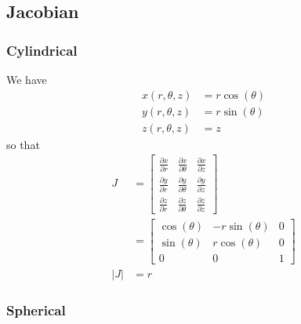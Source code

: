 \newpage

\subsection{Jacobian}

\subsubsection{Cylindrical}

We have
\begin{align*}
  x(r, \theta, z) & = r \cos(\theta) \\
  y(r, \theta, z) & = r \sin(\theta) \\
  z(r, \theta, z) & = z
\end{align*}
so that
\begin{align*}
  J &= \begin{bmatrix} \frac{\partial x}{\partial r} & \frac{\partial x}{\partial \theta} & \frac{\partial x}{\partial z} \\ \frac{\partial y}{\partial r} & \frac{\partial y}{\partial \theta} & \frac{\partial y}{\partial z} \\ \frac{\partial z}{\partial r} & \frac{\partial z}{\partial \theta} & \frac{\partial z}{\partial z} \end{bmatrix} \\
    &= \begin{bmatrix} \cos(\theta) & -r \sin(\theta) & 0 \\ \sin(\theta) & r \cos(\theta) & 0 \\ 0 & 0 & 1 \end{bmatrix} \\
  |J|  &= r
\end{align*}

\subsubsection{Spherical}

